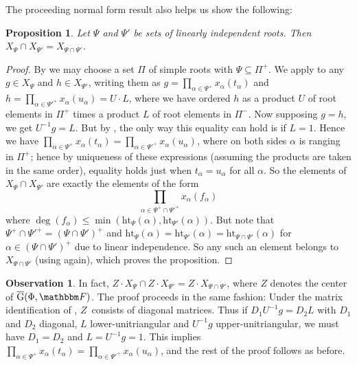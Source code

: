 \documentclass[10pt,a4paper]{article}
\newtheorem{proposition}[theorem]{Proposition}
\theoremstyle{definition}
\newtheorem{observation}[theorem]{Observation}
\newcommand{\F}{\mathbbm F}
\newcommand{\ol}[1]{\overline{#1}}
\newcommand{\Esc}[2]{\ol{\mathrm{G}}(#1,#2)}
\newcommand{\hgt}{{\mathrm{ht}}}
\begin{document}
The proceeding normal form result also helps us show the following:
\begin{proposition}\label{subint}
Let $\Psi$ and $\Psi'$ be sets of linearly independent roots. Then $X_\Psi \cap X_{\Psi'} = X_{\Psi \cap \Psi'}$.
\end{proposition}
\begin{proof}
    By  we may choose a set $\Pi$ of simple roots with $\Psi \subseteq \Pi^+$. We apply  to any $g \in X_\Psi$ and $h \in X_{\Psi'}$, writing them as $g = \prod_{\alpha \in \Psi^+} x_\alpha(t_\alpha)$ and $h = \prod_{\alpha \in \Psi'^+} x_\alpha(u_\alpha)  = U \cdot L$, where we have ordered $h$ as a product $U$ of root elements in $\Pi^+$ times a product $L$ of root elements in $\Pi^-$. Now supposing $g=h$, we get $U^{-1}g=L$. But by , the only way this equality can hold is if $L = 1$. Hence we have $\prod_{\alpha \in \Psi^+} x_\alpha(t_\alpha) = \prod_{\alpha \in \Psi'^+} x_\alpha(u_\alpha)$, where on both sides $\alpha$ is ranging in $\Pi^+$; hence by uniqueness of these expressions (assuming the products are taken in the same order), equality holds just when $t_\alpha = u_\alpha$ for all $\alpha$. So the elements of $X_{\Psi} \cap X_{\Psi'}$ are exactly the elements of the form
\[\prod_{\alpha \in \Psi^+ \cap \Psi'^+} x_\alpha(f_\alpha) \]
    where $\deg(f_\alpha) \le \min(\hgt_{\Psi}(\alpha),\hgt_{\Psi'}(\alpha))$. But note that $\Psi^+ \cap \Psi'^+=(\Psi \cap \Psi')^+$ and $\hgt_\Psi(\alpha) = \hgt_{\Psi'}(\alpha)=\hgt_{\Psi \cap \Psi'}(\alpha)$ for $\alpha \in (\Psi \cap \Psi')^+$ due to linear independence. So any such an element belongs to $X_{\Psi \cap \Psi'}$ (using  again), which proves the proposition.
\end{proof}
\begin{observation}\label{obs:centerint}
In fact, $Z \cdot X_{\Psi} \cap Z \cdot X_{\Psi'} = Z \cdot X_{\Psi \cap \Psi'}$, where $Z$ denotes the center of $\Esc{\Phi}{\F}$. The proof proceeds in the same fashion: Under the matrix identification of , $Z$~consists of diagonal matrices. Thus if $D_1 U^{-1}g = D_2 L$ with $D_1$ and $D_2$ diagonal, $L$ lower-unitriangular and $U^{-1}g$ upper-unitriangular, we must have $D_1=D_2$ and $L=U^{-1}g=1$. This implies $\prod_{\alpha \in \Psi^+} x_\alpha(t_\alpha) = \prod_{\alpha \in \Psi'^+} x_\alpha(u_\alpha)$, and the rest of the proof follows as before.
\end{observation}
\end{document}
